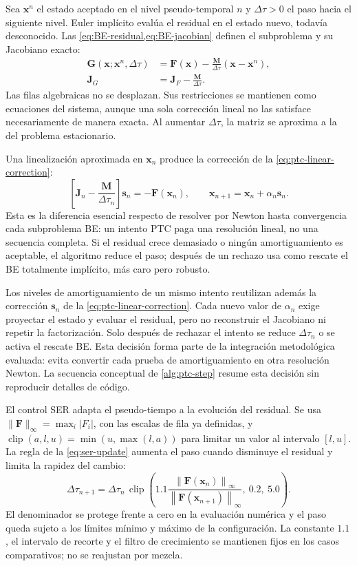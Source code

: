 \documentclass[12pt,a4paper,twoside,openany]{book}
\newcommand{\vect}[1]{\bm{#1}}
\newcommand{\mat}[1]{\bm{#1}}
\newcommand{\norm}[1]{\left\lVert #1\right\rVert}
\begin{document}
Sea \(\vect x^n\) el estado aceptado en el nivel pseudo-temporal \(n\) y
\(\Delta\tau>0\) el paso hacia el siguiente nivel. Euler implícito evalúa el
residual en el estado nuevo, todavía desconocido. Las
\cref{eq:BE-residual,eq:BE-jacobian} definen el subproblema y su Jacobiano exacto:
\begin{align}
 \vect G(\vect x;\vect x^n,\Delta\tau)
 &=\vect F(\vect x)-\frac{\mat M}{\Delta\tau}(\vect x-\vect x^n),
 \label{eq:BE-residual}\\
 \mat J_G&=\mat J_F-\frac{\mat M}{\Delta\tau}.
 \label{eq:BE-jacobian}
\end{align}
Las filas algebraicas no se desplazan. Sus restricciones se mantienen como
ecuaciones del sistema, aunque una sola corrección lineal no las satisface
necesariamente de manera exacta. Al aumentar \(\Delta\tau\), la matriz
se aproxima a la del problema estacionario.

Una linealización aproximada en \(\vect{x}_n\) produce la corrección de la \cref{eq:ptc-linear-correction}:
\begin{equation}
  \left[\mat{J}_n-\frac{\mat{M}}{\Delta\tau_n}\right]
  \vect{s}_n=-\vect{F}(\vect{x}_n),
  \qquad
  \vect{x}_{n+1}=\vect{x}_n+\alpha_n\vect{s}_n.
  \label{eq:ptc-linear-correction}
\end{equation}
Esta es la diferencia esencial respecto de resolver por Newton hasta convergencia
cada subproblema BE: un intento PTC paga una resolución lineal, no una secuencia
completa. Si el residual crece demasiado o ningún amortiguamiento es aceptable,
el algoritmo reduce el paso; después de un rechazo usa como rescate el BE
totalmente implícito, más caro pero robusto.

Los niveles de amortiguamiento de un mismo intento reutilizan además la
corrección \(\vect{s}_n\) de la \cref{eq:ptc-linear-correction}. Cada nuevo valor de
\(\alpha_n\) exige proyectar el estado y evaluar el residual, pero no reconstruir
el Jacobiano ni repetir la factorización. Solo después de rechazar el intento se
reduce \(\Delta\tau_n\) o se activa el rescate BE. Esta decisión forma parte de
la integración metodológica evaluada: evita convertir cada prueba de
amortiguamiento en otra resolución Newton. La secuencia conceptual de
\cref{alg:ptc-step} resume esta decisión sin reproducir detalles de código.

El control SER adapta el pseudo-tiempo a la evolución del residual. Se usa
\(\|\vect F\|_\infty=\max_i|F_i|\), con las escalas de fila ya definidas, y
\(\operatorname{clip}(a,l,u)=\min(u,\max(l,a))\) para limitar un valor al
intervalo \([l,u]\). La regla de la \cref{eq:ser-update} aumenta el paso cuando
disminuye el residual y limita la rapidez del cambio:
\begin{equation}
  \Delta\tau_{n+1}=\Delta\tau_n\,
  \operatorname{clip}\left(
  1.1\frac{\norm{\vect{F}(\vect{x}_n)}_\infty}
  {\norm{\vect{F}(\vect{x}_{n+1})}_\infty},\ 0.2,\ 5.0\right).
  \label{eq:ser-update}
\end{equation}
El denominador se protege frente a cero en la evaluación numérica y el paso
queda sujeto a los límites mínimo y máximo de la configuración.
La constante \(1.1\), el intervalo de recorte y el filtro de crecimiento se
mantienen fijos en los casos comparativos; no se reajustan por mezcla.
\end{document}
